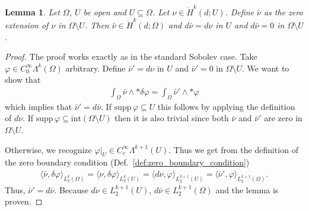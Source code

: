 \documentclass[12pt,a4paper]{article}
\numberwithin{equation}{subsection}
\newtheorem{lemma}{Lemma}[section]
\numberwithin{lemma}{subsection}
\theoremstyle{definition}
\newcommand{\smoothcompforms}[2]{C_0^\infty \Lambda^{#1}(#2)}
\begin{document}
\begin{lemma}\label{lem:extension_by_zero}
    Let $\Omega$, $U$ be open and $U \subseteq \Omega$. 
    Let $\nu \in \mathring{H}^k(d;U)$. Define $\bar{\nu}$ as the 
    zero extension of $\nu$ in $\Omega \setminus U$. 
    Then $\bar{\nu} \in \mathring{H}^k(d;\Omega)$ and 
    $d\bar{\nu} = d\nu$ in $U$ and $d\bar{\nu} = 0$ in $\Omega \setminus U$.
\end{lemma}
\begin{proof}
    The proof works exactly as in the standard Sobolev case. 
    Take $\varphi \in \smoothcompforms{k}{\Omega}$ arbitrary. 
    Define $\bar{\nu}' = d\nu$ in $U$ and $\bar{\nu}' = 0$ in 
    $\Omega \setminus U$. We want to show that 
    \begin{align*}
        \int_\Omega \bar{\nu} \wedge *\delta \varphi 
        = \int_\Omega \bar{\nu}' \wedge *\varphi
    \end{align*}
    which implies that $\bar{\nu}' = d\bar{\nu}$. If
    $\text{supp}\, \varphi \subseteq U$ this follows by applying the definition 
    of $d\nu$. If $\text{supp}\, \varphi \subseteq 
    \text{int}(\Omega \setminus U)$ then it is also trivial since both 
    $\bar{\nu}$ and $\bar{\nu}'$ are zero in $\Omega \setminus U$. 

    Otherwise, we recognize $\varphi |_U \in C_c^\infty \Lambda^{k+1}(U)$. 
    Thus we get from the definition of the zero boundary condition 
    (Def.~\ref{def:zero_boundary_condition})
    \begin{align*}
        \langle \bar{\nu}, \delta \varphi \rangle_{L^k_2(\Omega)}
        = \langle \nu, \delta \varphi \rangle_{L^k_2(U)}
        = \langle d\nu, \varphi \rangle_{L^{k+1}_2(U)}
        = \langle \bar{\nu}', \varphi \rangle_{L^{k+1}_2(\Omega)}.
    \end{align*}
    Thus, $\bar{\nu}' = d\bar{\nu}$. Because $d\nu \in L^{k+1}_2(U)$,
    $d\bar{\nu} \in L^{k+1}_2(\Omega)$ and the lemma is proven.
\end{proof}
\end{document}
